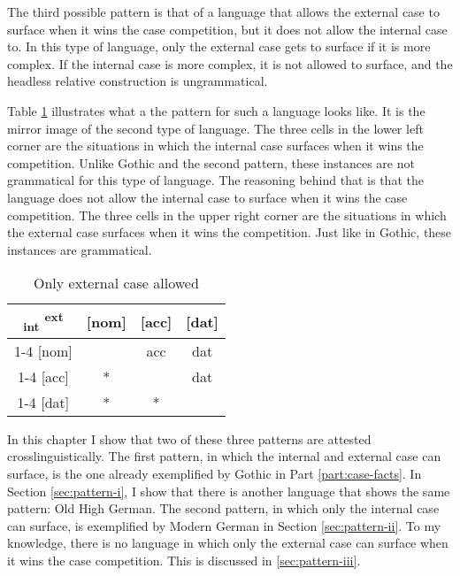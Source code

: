 The third possible pattern is that of a language that allows the external case to surface when it wins the case competition, but it does not allow the internal case to. In this type of language, only the external case gets to surface if it is more complex. If the internal case is more complex, it is not allowed to surface, and the headless relative construction is ungrammatical.

Table \ref{tbl:case-competition-only-ext} illustrates what a the pattern for such a language looks like. It is the mirror image of the second type of language.
The three cells in the lower left corner are the situations in which the internal case surfaces when it wins the competition. Unlike Gothic and the second pattern, these instances are not grammatical for this type of language. The reasoning behind that is that the language does not allow the internal case to surface when it wins the case competition.
The three cells in the upper right corner are the situations in which the external case surfaces when it wins the competition. Just like in Gothic, these instances are grammatical.

\begin{table}[H]
  \center
  \caption{Only external case allowed}
  \begin{tabular}{c|c|c|c}
    \toprule
    \textsubscript{\ac{int}} \textsuperscript{\ac{ext}}
           & [\ac{nom}]
           & [\ac{acc}]
           & [\ac{dat}]
           \\ \cmidrule{1-4}
       [\ac{nom}]
           &
           & \ac{acc}
           & \ac{dat}
           \\ \cmidrule{1-4}
       [\ac{acc}]
           & *
           &
           & \ac{dat}
           \\ \cmidrule{1-4}
       [\ac{dat}]
           & *
           & *
           &
           \\
     \bottomrule
  \end{tabular}
    \label{tbl:case-competition-only-ext}
\end{table}

In this chapter I show that two of these three patterns are attested crosslinguistically. The first pattern, in which the internal and external case can surface, is the one already exemplified by Gothic in Part \ref{part:case-facts}. In Section \ref{sec:pattern-i}, I show that there is another language that shows the same pattern: Old High German. The second pattern, in which only the internal case can surface, is exemplified by Modern German in Section \ref{sec:pattern-ii}. To my knowledge, there is no language in which only the external case can surface when it wins the case competition. This is discussed in \ref{sec:pattern-iii}.

